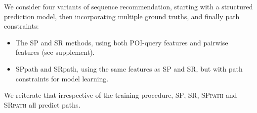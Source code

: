 We consider four variants of sequence recommendation, starting with a structured prediction model, then incorporating multiple ground truths, and finally path constraints:
\begin{itemize}[leftmargin=0.125in]
\item The SP and SR methods, %
      using both POI-query features and pairwise features (see supplement).

\item {\sc SPpath} and {\sc SRpath}, %
      using the same features as SP and SR, but with path constraints for model learning.
\end{itemize}%
We reiterate that irrespective of the training procedure, \textsc{SP}, \textsc{SR},
\textsc{SPpath} and \textsc{SRpath} all predict paths.




